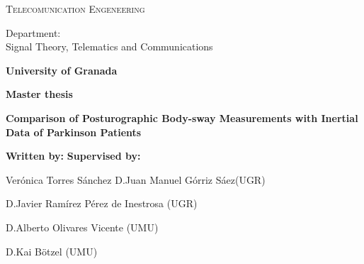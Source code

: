 \begin{titlepage}
\label{ch:cover}
\begin{center}

{\Large\textsc{Telecomunication Engeneering}}


Department:  \\ Signal Theory, Telematics and Communications

\textbf{University of Granada}


\vspace{0.5cm}

\begin{figure}[h]
	\centering
	\label{fig:ugr}
\end{figure}


\vspace{0.5cm}
\textbf{Master thesis}


\vspace{0.9cm}


{\Huge\textbf{Comparison of Posturographic Body-sway Measurements with Inertial Data of Parkinson Patients }}


\end{center}


\vspace{1.5cm}
\textbf{Written by:}  \hfill \textbf{Supervised by:}

Ver\'onica Torres S\'anchez \hfill    D.Juan Manuel Górriz Sáez(UGR)

							\hfill	  D.Javier Ramírez Pérez de Inestrosa (UGR)
							
							\hfill    D.Alberto Olivares Vicente (UMU)
							
							\hfill	  D.Kai Bötzel (UMU)


\end{titlepage}
